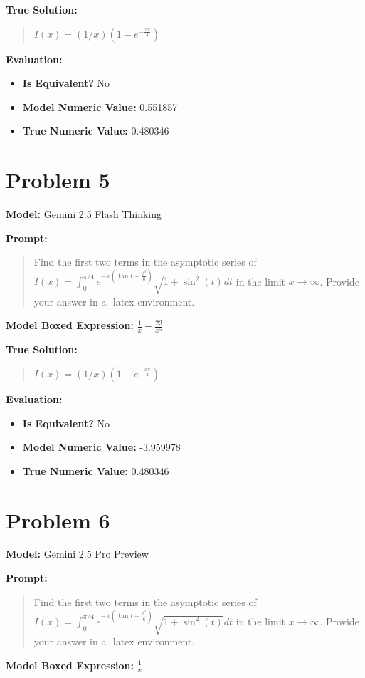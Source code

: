 \documentclass{article}
\begin{document}
\textbf{True Solution:}
\begin{quote}
$I(x)=(1/x)(1-e^{-\frac{x \pi}{4}})$
\end{quote}

\textbf{Evaluation:}
\begin{itemize}
\item \textbf{Is Equivalent?} No
\item \textbf{Model Numeric Value:} 0.551857
\item \textbf{True Numeric Value:} 0.480346
\end{itemize}
\vspace{1cm}
\section*{Problem 5}
\textbf{Model:} Gemini 2.5 Flash Thinking

\textbf{Prompt:}
\begin{quote}
Find the first two terms in the asymptotic series of $I(x)=\int_0^{\pi/4} e^{-x(\tan{t}-\frac{t^3}{6})}\sqrt{1+\sin^2(t)}dt$ in the limit $x \to \infty$. Provide your answer in a $\boxed{}$ latex environment.
\end{quote}
\textbf{Model Boxed Expression:} $\frac{1}{x} - \frac{23}{x^5}$

\textbf{True Solution:}
\begin{quote}
$I(x)=(1/x)(1-e^{-\frac{x \pi}{4}})$
\end{quote}

\textbf{Evaluation:}
\begin{itemize}
\item \textbf{Is Equivalent?} No
\item \textbf{Model Numeric Value:} -3.959978
\item \textbf{True Numeric Value:} 0.480346
\end{itemize}
\vspace{1cm}
\section*{Problem 6}
\textbf{Model:} Gemini 2.5 Pro Preview

\textbf{Prompt:}
\begin{quote}
Find the first two terms in the asymptotic series of $I(x)=\int_0^{\pi/4} e^{-x(\tan{t}-\frac{t^3}{6})}\sqrt{1+\sin^2(t)}dt$ in the limit $x \to \infty$. Provide your answer in a $\boxed{}$ latex environment.
\end{quote}
\textbf{Model Boxed Expression:} $\frac{1}{x}$
\end{document}
